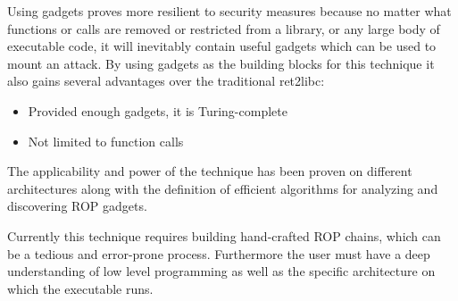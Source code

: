 
Using gadgets proves more resilient to security measures because no matter what functions or calls are removed or restricted from a library, or any large body of executable code, it will inevitably contain useful gadgets which can be used to mount an attack. By using gadgets as the building blocks for this technique it also gains several advantages over the traditional ret2libc:
\begin{itemize}
	\item Provided enough gadgets, it is Turing-complete
	\item Not limited to function calls
\end{itemize}

The applicability and power of the technique has been proven on different architectures\cite{roemer2012rop} along with the definition of efficient algorithms for analyzing and discovering ROP gadgets.

Currently this technique requires building hand-crafted ROP chains, which can be a tedious and error-prone process. Furthermore the user must have a deep understanding of low level programming as well as the specific architecture on which the executable runs.

